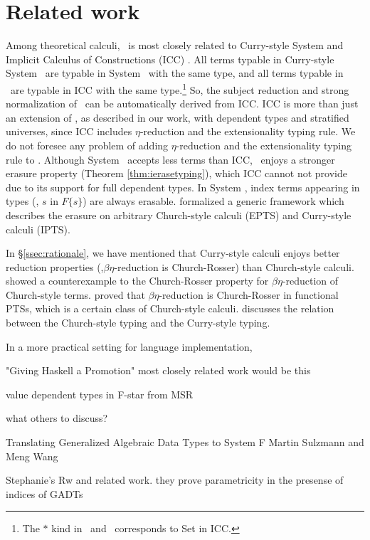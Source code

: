 \section{Related work}
\label{sec:relwork}
Among theoretical calculi, \Fi\ is most closely related to
Curry-style System \Fw \cite{AbeMatUus03,AbeMatUus05,GHR93}
and Implicit Calculus of Constructions (ICC) \cite{Miquel01}.
All terms typable in Curry-style System \Fw\ are typable in System \Fi\ 
with the same type, and all terms typable in \Fi\ are typable in ICC
with the same type.\footnote{The $*$ kind in \Fw\ and \Fi\ corresponds
	to \textsf{Set} in ICC.}
So, the subject reduction and strong normalization of \Fi\ 
can be automatically derived from ICC. ICC is more than just an extension of
\Fi, as described in our work, with dependent types and stratified universes,
since ICC includes $\eta$-reduction and the extensionality typing rule.
We do not foresee any problem of adding $\eta$-reduction and
the extensionality typing rule to \Fi. Although System \Fi\ accepts
less terms than ICC, \Fi\ enjoys a stronger erasure property
(Theorem \ref{thm:ierasetyping}), which ICC cannot not provide
due to its support for full dependent types. In System \Fi, index terms
appearing in types (\eg, $s$ in $F\{s\}$) are always erasable.
\citet{LingerS08} formalized a generic framework which describes the erasure on
arbitrary Church-style calculi (EPTS) and Curry-style calculi (IPTS).

In \S\ref{ssec:rationale}, we have mentioned that Curry-style calculi enjoys
better reduction properties (\eg,$\beta\eta$-reduction is Church-Rosser)
than Church-style calculi. \citet{Nederpelt73} showed a counterexample to
the Church-Rosser property for $\beta\eta$-reduction of Church-style terms.
\citet{Geuvers92} proved that $\beta\eta$-reduction is Church-Rosser
in functional PTSs, which is a certain class of Church-style calculi.
\citet{Seldin08} discusses the relation between the Church-style typing
and the Curry-style typing.

In a more practical setting for language implementation,

\citet{YorgeyWCJVM12}
"Giving Haskell a Promotion" 
most closely related work would be this

\citet{Swamy11}
value dependent types in F-star  from MSR


what others to discuss?

Translating Generalized Algebraic Data Types to System F
Martin Sulzmann and Meng Wang

Stephanie's Rw and related work.
they prove parametricity in the presense of indices of GADTs
